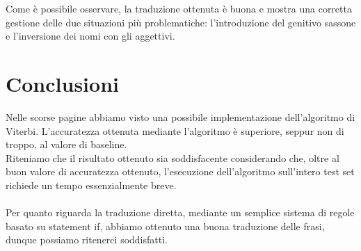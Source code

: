 \documentclass[10pt]{article}
\begin{document}
\noindent Come è possibile osservare, la traduzione ottenuta è buona e mostra una corretta gestione delle due situazioni più problematiche: l'introduzione del genitivo sassone e l'inversione dei nomi con gli aggettivi.

\section{Conclusioni}
Nelle scorse pagine abbiamo visto una possibile implementazione dell'algoritmo di Viterbi. L'accuratezza ottenuta mediante l'algoritmo è superiore, seppur non di troppo, al valore di baseline.\\
Riteniamo che il risultato ottenuto sia soddisfacente considerando che, oltre al buon valore di accuratezza ottenuto, l'esecuzione dell'algoritmo sull'intero test set richiede un tempo essenzialmente breve.\\
\\
Per quanto riguarda la traduzione diretta, mediante un semplice sistema di regole basato su statement if, abbiamo ottenuto una buona traduzione delle frasi, dunque possiamo ritenerci soddisfatti.

\newpage
\end{document}

